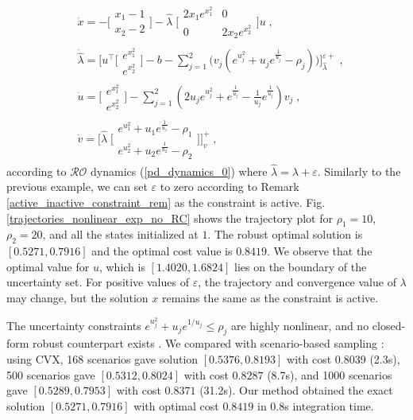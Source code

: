 \documentclass[journal,twoside,web]{ieeecolor}
\begin{document}
\begin{align*}
&\dot x=-\Big[\begin{array}{ccl} x_1-1 \\ x_2-2 \end{array}\Big]-\hat{\lambda}\; \Big[\begin{array}{cc} 2 x_1 e^{x_1^2} & 0 \\ 0 & 2 x_2 e^{x_2^2}\end{array}\Big]u \nonumber\;,\\
&\dot {\hat{\lambda}} = \Big[u^\top \Big[\begin{array}{cc} e^{x_1^2}\\ e^{x_2^2}\end{array}\Big]-b- \sum_{j=1}^2 \big(v_j(e^{u_j^2}+u_j e^{\frac{1}{u_j}}-\rho_j)\big)\Big]_{\hat{\lambda}}^{\varepsilon+}\nonumber\;,\\
&\dot u=\Big[\begin{array}{cc} e^{x_1^2}\\ e^{x_2^2}\end{array}\Big]- \sum_{j=1}^2(2u_j e^{u_j^2}+e^{\frac{1}{u_j}}-\frac{1}{u_j} e^{\frac{1}{u_j}}) v_j\nonumber\;,\\
&\dot v=\Big[\hat{\lambda}\; \Big[\begin{array}{cc} e^{u_1^2}+u_1 e^{\frac{1}{u_1}}-\rho_1 \\ e^{u_2^2}+u_2 e^{\frac{1}{u_2}}-\rho_2 \end{array}\Big] \Big]_{v}^+\nonumber\;,
\end{align*}
according to $\mathcal{RO}$ dynamics (\ref{pd_dynamics_0}) where $\hat{\lambda}=\lambda+\varepsilon$. Similarly to the previous example, we can set $\varepsilon$ to zero according to Remark \ref{active_inactive_constraint_rem} as the constraint is active. Fig. \ref{trajectories_nonlinear_exp_no_RC} shows the trajectory plot for $\rho_1=10$, $\rho_2=20$, and all the states initialized at $1$. The robust optimal solution is $[0.5271, 0.7916]$ and the optimal cost value is $0.8419$. We observe that the optimal value for $u$, which is $[1.4020, 1.6824]$ lies on the boundary of the uncertainty set. For positive values of $\varepsilon$, the trajectory and convergence value of $\lambda$ may change, but the solution $x$ remains the same as the constraint is active.

The uncertainty constraints $e^{u_j^2}+u_j e^{1/u_j} \leq \rho_j$ are highly nonlinear, and no closed-form robust counterpart exists \cite{bental2009,gorissen20152}. We compared with scenario-based sampling \cite{calafiore2004}: using CVX, 168 scenarios gave solution $[0.5376, 0.8193]$ with cost $0.8039$ (2.3s), 500 scenarios gave $[0.5312, 0.8024]$ with cost $0.8287$ (8.7s), and 1000 scenarios gave $[0.5289, 0.7953]$ with cost $0.8371$ (31.2s). Our method obtained the exact solution $[0.5271, 0.7916]$ with optimal cost $0.8419$ in 0.8s integration time.
\end{document}

